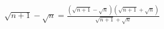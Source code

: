 \documentclass[preview]{standalone}
\begin{document}
\begin{align*}
\sqrt{n+1} - \sqrt{n} = \frac{ (\sqrt{n+1} - \sqrt{n}) (\sqrt{n+1} + \sqrt{n}) }{ \sqrt{n+1} + \sqrt{n} }
\end{align*}
\end{document}
